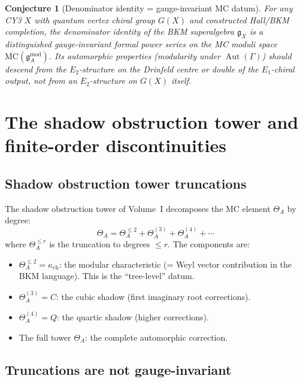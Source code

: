 \documentclass[11pt]{article}
\newtheorem{conjecture}[theorem]{Conjecture}
\theoremstyle{definition}
\theoremstyle{remark}
\newcommand{\frakg}{\mathfrak{g}}
\newcommand{\MC}{\mathrm{MC}}
\DeclareMathOperator{\Aut}{Aut}
\begin{document}
\begin{conjecture}[Denominator identity = gauge-invariant MC datum]
\label{conj:denom-gauge-inv}
For any CY3 $X$ with quantum vertex chiral group $G(X)$ and constructed
Hall/BKM completion, the denominator identity of the BKM superalgebra
$\frakg_X$ is a distinguished gauge-invariant formal power series on the
MC moduli space $\overline{\MC}(\frakg^{\mathrm{mod}}_A)$. Its
automorphic properties (modularity under $\Aut(\Gamma)$) should descend
from the $E_2$-structure on the Drinfeld centre or double of the
$E_1$-chiral output, not from an $E_2$-structure on $G(X)$ itself.
\end{conjecture}

\section{The shadow obstruction tower and finite-order discontinuities}
\label{sec:shadow-tower-wc}

\subsection{Shadow obstruction tower truncations}
\label{ssec:shadow-trunc}

The shadow obstruction tower of Volume~I decomposes the MC element
$\Theta_A$ by degree:
\begin{equation}\label{eq:shadow-tower}
 \Theta_A = \Theta^{\leq 2}_A + \Theta^{(3)}_A + \Theta^{(4)}_A + \cdots
\end{equation}
where $\Theta^{\leq r}_A$ is the truncation to degrees $\leq r$. The
components are:
\begin{itemize}
\item $\Theta^{\leq 2}_A = \kappa_{\mathrm{ch}}$: the modular characteristic (= Weyl
 vector contribution in the BKM language). This is the ``tree-level''
 datum.
\item $\Theta^{(3)}_A = C$: the cubic shadow (first imaginary root
 corrections).
\item $\Theta^{(4)}_A = Q$: the quartic shadow (higher corrections).
\item The full tower $\Theta_A$: the complete automorphic correction.
\end{itemize}

\subsection{Truncations are not gauge-invariant}
\label{ssec:trunc-not-gauge-inv}
\end{document}
